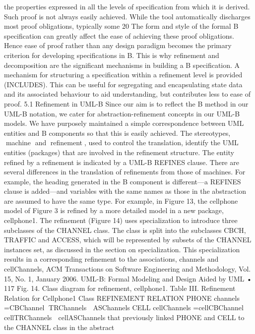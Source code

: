 the properties expressed in all the levels of specification from which it is derived. Such proof is not always easily achieved. While the tool automatically
discharges most proof obligations, typically some 20%
The form and style of the formal B specification can greatly affect the ease
of achieving these proof obligations. Hence ease of proof rather than any design paradigm becomes the primary criterion for developing specifications in B.
This is why refinement and decomposition are the significant mechanisms in
building a B specification. A mechanism for structuring a specification within a
refinement level is provided (INCLUDES). This can be useful for segregating and
encapsulating state data and its associated behaviour to aid understanding,
but contributes less to ease of proof.
5.1 Refinement in UML-B
Since our aim is to reflect the B method in our UML-B notation, we cater
for abstraction-refinement concepts in our UML-B models. We have purposely
maintained a simple correspondence between UML entities and B components so that this is easily achieved. The stereotypes, machine and
refinement, used to control the translation, identify the UML entities (packages) that are involved in the refinement structure. The entity refined by a refinement is indicated by a UML-B REFINES clause. There are several differences
in the translation of refinements from those of machines. For example, the heading generated in the B component is different—a REFINES clause is added—and
variables with the same names as those in the abstraction are assumed to have
the same type. For example, in Figure 13, the cellphone model of Figure 3 is
refined by a more detailed model in a new package, cellphone1.
The refinement (Figure 14) uses specialization to introduce three subclasses
of the CHANNEL class. The class is split into the subclasses CBCH, TRAFFIC
and ACCESS, which will be represented by subsets of the CHANNEL instances
set, as discussed in the section on specialization. This specialization results
in a corresponding refinement to the associations, channels and cellChannels,
ACM Transactions on Software Engineering and Methodology, Vol. 15, No. 1, January 2006.
UML-B: Formal Modeling and Design Aided by UML • 117
Fig. 14. Class diagram for refinement, cellphone1.
Table III. Refinement Relation for Cellphone1
Class REFINEMENT RELATION
PHONE channels ={CBChannel}∪ TRChannels ∪ ASChannels
CELL cellChannels ={cellCBChannel}∪ cellTRChannels ∪ cellASChannels
that previously linked PHONE and CELL to the CHANNEL class in the abstract
